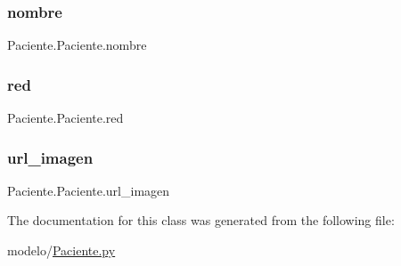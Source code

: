 \subsubsection{\texorpdfstring{nombre}{nombre}}
{\footnotesize\ttfamily Paciente.\+Paciente.\+nombre}

\mbox{\label{class_paciente_1_1_paciente_ad5dd0b61b2f837ec4f5407ee2a5bb605}} 
\subsubsection{\texorpdfstring{red}{red}}
{\footnotesize\ttfamily Paciente.\+Paciente.\+red}

\mbox{\label{class_paciente_1_1_paciente_a5af3b0cc2e0a1469d603f2efea44df45}} 
\subsubsection{\texorpdfstring{url\+\_\+imagen}{url\_imagen}}
{\footnotesize\ttfamily Paciente.\+Paciente.\+url\+\_\+imagen}



The documentation for this class was generated from the following file\+:\begin{DoxyCompactItemize}
\item 
modelo/\mbox{\hyperlink{_paciente_8py}{Paciente.\+py}}\end{DoxyCompactItemize}
